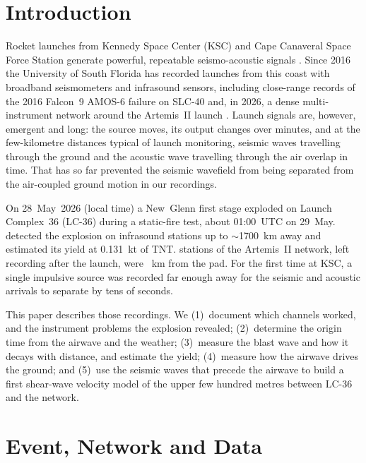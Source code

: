 \documentclass[]{seismica}
\begin{document}
\section{Introduction}

Rocket launches from Kennedy Space Center (KSC) and Cape Canaveral Space
Force Station generate powerful, repeatable seismo-acoustic signals
\citep{Kanamori1991,Hupe2019,schuster_rocketquake_2025}. Since 2016 the
University of South Florida has recorded launches from this coast with
broadband seismometers and infrasound sensors, including close-range
records of the 2016 Falcon~9 AMOS-6 failure on SLC-40
\citep{thompson_amos6_2026} and, in 2026, a dense multi-instrument
network around the Artemis~II launch
\citep{thompson_artemis2_recording_2026,thompson_artemis2_source_2026}.
Launch signals are, however, emergent and long: the source moves, its
output changes over minutes, and at the few-kilometre distances typical
of launch monitoring, seismic waves travelling through the ground and
the acoustic wave travelling through the air overlap in time. That has
so far prevented the seismic wavefield from being separated from the air-coupled
ground motion in our recordings.

On 28~May~2026 (local time) a New~Glenn first stage exploded on Launch
Complex~36 (LC-36) during a static-fire test, about 01:00~UTC on
29~May. \citet{silber_scamfer_newglenn_2026} detected the explosion on
infrasound stations up to $\sim$1700~km away and estimated its yield at
0.131~kt of TNT. \NGnStationsCap{} stations of the Artemis~II network, left
recording after the launch, were \NGdistRange~km from the pad. For the
first time at KSC, a single impulsive source was recorded far enough
away for the seismic and acoustic arrivals to separate by tens of
seconds.

This paper describes those recordings. We (1)~document which channels
worked, and the instrument problems the explosion revealed; (2)~determine
the origin time from the airwave and the weather; (3)~measure the blast
wave and how it decays with distance, and estimate the yield; (4)~measure
how the airwave drives the ground; and (5)~use the seismic waves that
precede the airwave to build a first shear-wave velocity model of the
upper few hundred metres between LC-36 and the network.

\section{Event, Network and Data}
\end{document}

